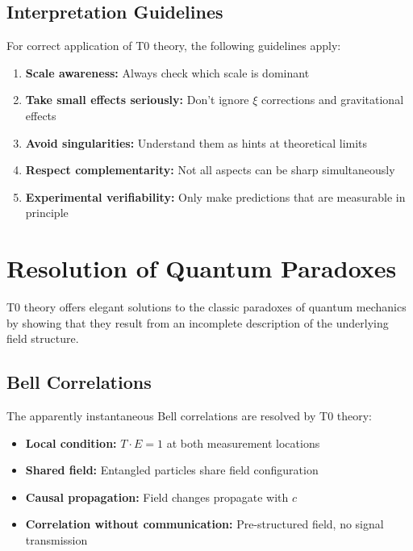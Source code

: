 \documentclass[12pt,a4paper]{article}
\begin{document}
	\subsection{Interpretation Guidelines}
	
	For correct application of T0 theory, the following guidelines apply:
	
	\begin{enumerate}
		\item \textbf{Scale awareness:} Always check which scale is dominant
		\item \textbf{Take small effects seriously:} Don't ignore $\xi$ corrections and gravitational effects
		\item \textbf{Avoid singularities:} Understand them as hints at theoretical limits
		\item \textbf{Respect complementarity:} Not all aspects can be sharp simultaneously
		\item \textbf{Experimental verifiability:} Only make predictions that are measurable in principle
	\end{enumerate}
	
	\section{Resolution of Quantum Paradoxes}
	
	T0 theory offers elegant solutions to the classic paradoxes of quantum mechanics by showing that they result from an incomplete description of the underlying field structure.
	
	\subsection{Bell Correlations}
	
	The apparently instantaneous Bell correlations are resolved by T0 theory:
	
	\begin{itemize}
		\item \textbf{Local condition:} $T \cdot E = 1$ at both measurement locations
		\item \textbf{Shared field:} Entangled particles share field configuration
		\item \textbf{Causal propagation:} Field changes propagate with $c$
		\item \textbf{Correlation without communication:} Pre-structured field, no signal transmission
	\end{itemize}
	
\end{document}
